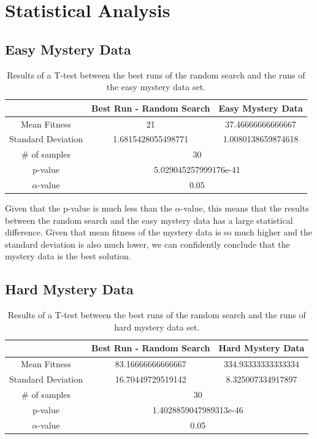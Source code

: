 \documentclass{article}
\begin{document}
\pagebreak
\section{Statistical Analysis}
\subsection{Easy Mystery Data}


\begin{table}[ht]
\centering
\begin{tabular}{|c|c|c|}
\hline
\textbf{} & \textbf{Best Run - Random Search} & \textbf{Easy Mystery Data} \\
\hline
Mean Fitness & 21 & 37.46666666666667\\
\hline
Standard Deviation & 1.6815428055498771 & 1.0080138659874618\\

\hline
\# of samples & \multicolumn{2}{|c|}{30} \\
\hline
p-value & \multicolumn{2}{|c|}{5.029045257999176e-41} \\
\hline

$\alpha$-value & \multicolumn{2}{|c|}{0.05} \\\hline
\end{tabular}
\caption{Results of a T-test between the best runs of the random search and the runs of the easy mystery data set.}
\end{table}

Given that the p-value is much less than the $\alpha$-value, 
this means that the results between the random search and the easy mystery data
has a large statistical difference. Given that mean fitness of the mystery data is so much higher
and the standard deviation is also much lower, we can confidently conclude that the mystery
data is the best solution.
\subsection{Hard Mystery Data}

\begin{table}[ht]
\centering
\begin{tabular}{|c|c|c|}
\hline
\textbf{} & \textbf{Best Run - Random Search} & \textbf{Hard Mystery Data} \\
\hline
Mean Fitness & 83.16666666666667 & 334.93333333333334\\
\hline
Standard Deviation & 16.70449729519142 & 8.325007334917897\\

\hline
\# of samples & \multicolumn{2}{|c|}{30} \\
\hline
p-value & \multicolumn{2}{|c|}{1.4028859047989313e-46} \\
\hline

$\alpha$-value & \multicolumn{2}{|c|}{0.05} \\\hline
\end{tabular}
\caption{Results of a T-test between the best runs of the random search and the runs of hard mystery data set.}
\end{table}
\end{document}
